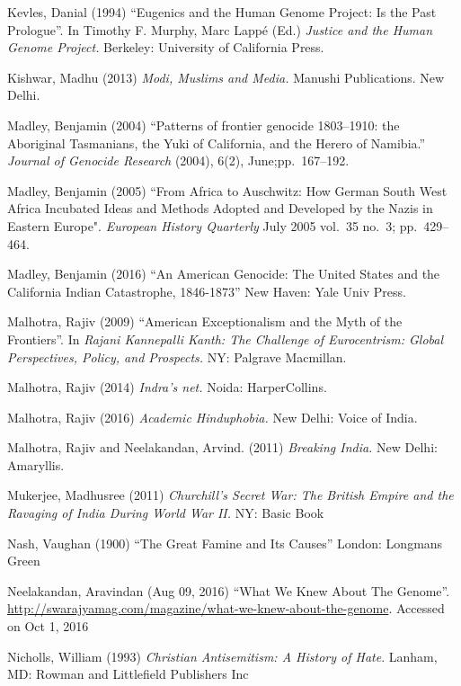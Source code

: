 \begin{thebibliography}{99}
Kevles, Danial  (1994) “Eugenics and the Human Genome Project: Is the Past Prologue”. In Timothy F. Murphy, Marc Lappé (Ed.) {\sl Justice and the Human Genome Project.} Berkeley: University of California Press. 

Kishwar, Madhu (2013) {\sl Modi, Muslims and Media.} Manushi Publications. New Delhi.

Madley, Benjamin (2004) “Patterns of frontier genocide 1803--1910: the Aboriginal Tasmanians, the Yuki of California, and the Herero of Namibia.” {\sl Journal of Genocide Research} (2004), 6(2), June;\break pp.~167--192.

Madley, Benjamin (2005) “From Africa to Auschwitz: How German South West Africa Incubated Ideas and Methods Adopted and Developed by the Nazis in Eastern Europe". {\sl European History Quarterly} July 2005 vol.~35 no.~3; pp.~429--464.

Madley, Benjamin (2016) “An American Genocide: The United States and the California Indian Catastrophe, 1846-1873”  New Haven: Yale Univ Press.

Malhotra, Rajiv (2009) “American Exceptionalism and the Myth of the Frontiers”. In {\sl Rajani Kannepalli Kanth: The Challenge of Eurocentrism: Global Perspectives, Policy, and Prospects.} NY: Palgrave Macmillan.

Malhotra, Rajiv (2014) {\sl Indra’s net.} Noida: HarperCollins.

Malhotra, Rajiv (2016) {\sl Academic Hinduphobia.} New Delhi: Voice of India.

Malhotra, Rajiv and Neelakandan, Arvind. (2011) {\sl Breaking India.} New Delhi: Amaryllis. 

Mukerjee, Madhusree (2011) {\sl Churchill's Secret War: The British Empire and the Ravaging of India During World War II.} NY: Basic Book

Nash, Vaughan (1900) “The Great Famine and Its Causes” London: Longmans Green

Neelakandan, Aravindan (Aug 09, 2016) “What We Knew About The Genome”. \url{http://swarajyamag.com/magazine/what-we-knew-about-the-genome}. 
Accessed on Oct 1, 2016

Nicholls, William (1993) {\sl Christian Antisemitism: A History of Hate}. Lanham, MD: Rowman and Littlefield Publishers Inc


\end{thebibliography}
